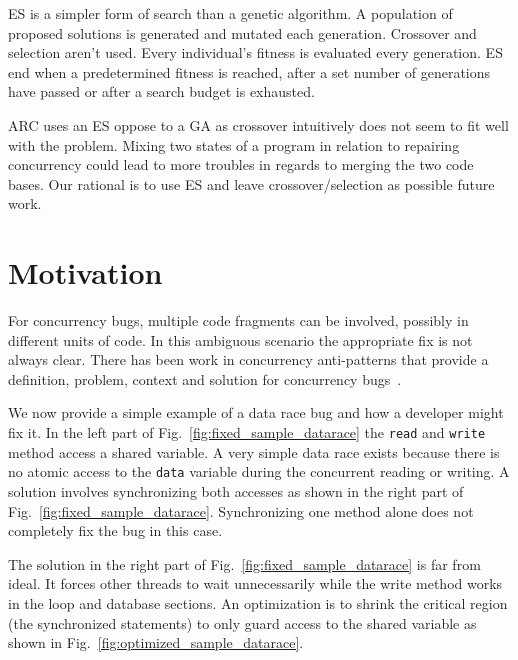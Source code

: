 \documentclass{llncs}
\begin{document}
ES is a simpler form of search than a genetic algorithm. A population of
proposed solutions is generated and mutated each generation. Crossover and
selection aren't used. Every individual's fitness is evaluated every generation. ES
end when a predetermined fitness is reached, after a set number of
generations have passed or after a search budget is exhausted.

ARC uses an ES oppose to a GA as crossover intuitively does not seem to fit
well with the problem. Mixing two states of a program in relation to repairing
concurrency could lead to more troubles in regards to merging the two code
bases. Our rational is to use ES and leave crossover/selection as possible
future work.

\section{Motivation}
\label{sec:motivation}

For concurrency bugs, multiple code fragments can be involved, possibly in
different units of code. In this ambiguous scenario the appropriate fix is not
always clear. There has been work in concurrency anti-patterns that provide a
definition, problem, context and solution for concurrency
bugs~\cite{BJ09,FKLV12}.

We now provide a simple example of a data race bug and how a developer might fix it.
In the left part of Fig.~\ref{fig:fixed_sample_datarace} the \texttt{read} and
\texttt{write} method access a shared variable. A very simple data race exists
because there is no atomic access to the \texttt{data} variable during the
concurrent reading or writing.
A solution involves synchronizing both accesses as shown in the right part of
Fig.~\ref{fig:fixed_sample_datarace}. Synchronizing one method alone does not
completely fix the bug in this case.


The solution in the right part of Fig.~\ref{fig:fixed_sample_datarace} is far
from ideal. It forces other threads to wait unnecessarily while the write
method works in the loop and database sections. An optimization is to shrink
the critical region (the synchronized statements) to only guard access to the
shared variable as shown in Fig.~\ref{fig:optimized_sample_datarace}.
\end{document}

